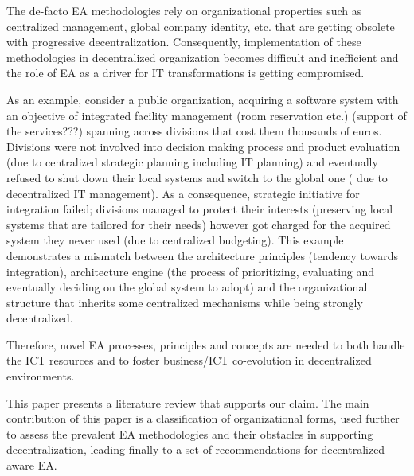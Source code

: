 The de-facto EA methodologies rely on organizational properties such as centralized management, global company identity, etc.  that are getting obsolete with progressive decentralization.  Consequently, implementation of these methodologies in decentralized organization becomes difficult and inefficient and  the role of EA as a driver for IT transformations is getting compromised.

As an example, consider a public organization,  acquiring a software system with an objective of integrated facility management (room reservation etc.) (support of the services???) spanning across divisions that cost them thousands of euros. Divisions were not involved into decision making process and product evaluation (due to centralized strategic planning including IT planning) and eventually refused to shut down their local systems and switch to the global one ( due to decentralized IT management). As a consequence, strategic initiative for integration failed; divisions managed to protect their interests  (preserving local  systems  that  are  tailored for their needs) however got charged for the acquired system they never used (due to centralized budgeting). This example demonstrates a mismatch between the architecture principles (tendency towards integration), architecture engine (the process of prioritizing, evaluating and eventually deciding on the global system to adopt) and the organizational structure that inherits some centralized mechanisms while being strongly decentralized.




Therefore, novel EA processes, principles and concepts are needed to both handle the ICT resources and to foster business/ICT co-evolution in decentralized environments.

This paper presents a literature review that supports our claim. The main contribution of this paper is a classification of organizational forms, used further to assess the prevalent EA methodologies and their obstacles in supporting decentralization, leading finally to a set of recommendations for decentralized-aware EA.

